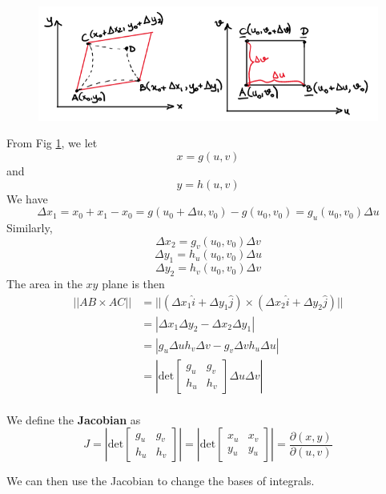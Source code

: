 \documentclass[12pt]{article}
\begin{document}
\begin{figure}
	\centering
	\includegraphics[width=\textwidth]{pic}
	\label{fig1}
\end{figure}

From Fig \ref{fig1}, we let
$$x = g(u,v)$$
and
$$y = h(u,v)$$
We have
$$\Delta x_1 = x_0 + x_1 - x_0 = g(u_0 + \Delta u, v_0) - g(u_0, v_0) = g_u(u_0,v_0)\Delta u$$
Similarly,
$$\Delta x_2 = g_v(u_0,v_0)\Delta v$$
$$\Delta y_1 = h_u(u_0,v_0)\Delta u$$
$$\Delta y_2 = h_v(u_0,v_0)\Delta v$$
The area in the $xy$ plane is then
\begin{align*}
||AB \times AC|| &= ||(\Delta x_1\hat{i} + \Delta y_1\hat{j}) \times (\Delta x_2\hat{i} + \Delta y_2\hat{j})|| \\
		 &= |\Delta x_1\Delta y_2 - \Delta x_2\Delta y_1| \\
		 &= |g_u\Delta uh_v\Delta v - g_v\Delta vh_u\Delta u| \\
		 &= \left| \text{det} \begin{bmatrix} g_u & g_v \\ h_u & h_v \end{bmatrix} \Delta u\Delta v \right| \\
\end{align*}

\begin{defn}
	We define the \textbf{Jacobian} as
	$$J = \left| \text{det} \begin{bmatrix} g_u & g_v \\ h_u & h_v \end{bmatrix} \right| = \left| \text{det} \begin{bmatrix} x_u & x_v \\ y_u & y_u \end{bmatrix} \right| = \frac{\partial(x,y)}{\partial(u,v)}$$
\end{defn}

We can then use the Jacobian to change the bases of integrals.
\end{document}
